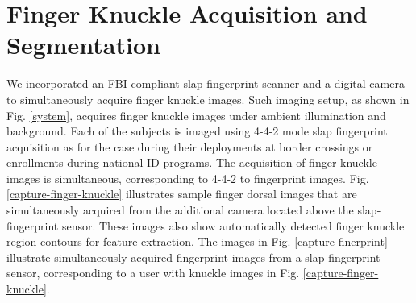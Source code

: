 \section{Finger Knuckle Acquisition and Segmentation\label{fk-acquire}}

We incorporated an FBI-compliant slap-fingerprint scanner and a digital camera to simultaneously acquire finger knuckle images. Such imaging setup, as shown in Fig. \ref{system}, acquires finger knuckle images under ambient illumination and background. Each of the subjects is imaged using 4-4-2 mode slap fingerprint acquisition \cite{watson2009slapssegii} as for the case during their deployments at border crossings or enrollments during national ID programs. The acquisition of finger knuckle images is simultaneous, corresponding to 4-4-2 to fingerprint images. Fig. \ref{capture-finger-knuckle} illustrates sample finger dorsal images that are simultaneously acquired from the additional camera located above the slap-fingerprint sensor. These images also show automatically detected finger knuckle region contours for feature extraction. The images in Fig. \ref{capture-finerprint} illustrate simultaneously acquired fingerprint images from a slap fingerprint sensor, corresponding to a user with knuckle images in Fig. \ref{capture-finger-knuckle}.


